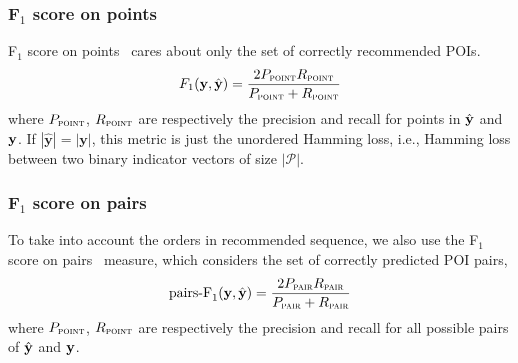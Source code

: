 \subsubsection{F$_1$ score on points}
F$_1$ score on points~\cite{ijcai15} cares about only the set of correctly recommended POIs.
\begin{equation*}
F_1(\mathbf{y}, \hat{\mathbf{y}}) = \frac{2  P_{\textsc{point}}  R_{\textsc{point}}}{P_{\textsc{point}} + R_{\textsc{point}}}
\end{equation*}
where $P_\textsc{point}$, $R_\textsc{point}$ are respectively the precision and recall for points in $\hat{\mathbf{y}}$ and $\mathbf{y}$.
If $| \hat{\mathbf{y}} | = | \mathbf{y} |$, this metric is just the unordered Hamming loss,
i.e., Hamming loss between two binary indicator vectors of size $| \mathcal{P} |$.

\subsubsection{F$_1$ score on pairs}
To take into account the orders in recommended sequence, 
we also use the F$_1$ score on pairs~\cite{cikm16paper} measure, which considers the set of correctly predicted POI pairs,
\begin{equation*}
\text{pairs-F}_1(\mathbf{y}, \hat{\mathbf{y}}) = \frac{2 P_{\textsc{pair}} R_{\textsc{pair}}}{P_{\textsc{pair}} + R_{\textsc{pair}}}
\end{equation*}
where $P_\textsc{point}$, $R_\textsc{point}$ are respectively the precision and recall for all possible pairs of $\hat{\mathbf{y}}$ and $\mathbf{y}$.



